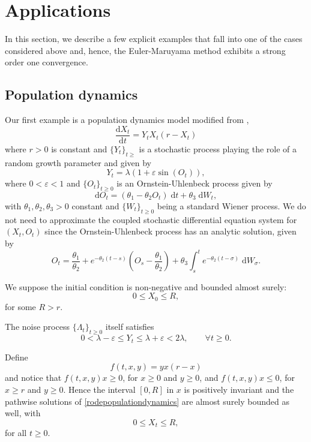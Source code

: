 \documentclass[reqno,12pt]{amsart}
\theoremstyle{plain}%
\theoremstyle{definition}
\begin{document}
\section{Applications}

In this section, we describe a few explicit examples that fall into one of the cases considered above and, hence, the Euler-Maruyama method exhibits a strong order one convergence.

\subsection{Population dynamics}

Our first example is a population dynamics model modified from \cite[Section 15.2]{HanKloeden2017},
\begin{equation}
    \label{rodepopulationdynamics}
    \frac{\mathrm{d}X_t}{\mathrm{d}t} = Y_t X_t (r - X_t)
\end{equation}
where $r > 0$ is constant and $\{Y_t\}_{t \geq}$ is a stochastic process playing the role of a random growth parameter and given by
\[
    Y_t = \lambda (1 + \varepsilon \sin(O_t)),
\]
where $0 < \varepsilon < 1$ and $\{O_t\}_{t \geq 0}$ is an Ornstein-Uhlenbeck process given by
\[
    \mathrm{d}O_t = (\theta_1 - \theta_2 O_t)\;\mathrm{d}t + \theta_3\;\mathrm{d}W_t,
\]
with $\theta_1, \theta_2, \theta_3 > 0$ constant and $\{W_t\}_{t\geq 0}$ being a standard Wiener process. We do not need to approximate the coupled stochastic differential equation system for $(X_t, O_t)$ since the Ornstein-Uhlenbeck process has an analytic solution, given by
\[
    O_t = \frac{\theta_1}{\theta_2} + e^{-\theta_2 (t - s)}\left(O_s - \frac{\theta_1}{\theta_2}\right) + \theta_3\int_s^t e^{-\theta_2 (t - \sigma)}\;\mathrm{d}W_\sigma.
\]

We suppose the initial condition is non-negative and bounded almost surely:
\[
    0 \leq X_0 \leq R,
\]
for some $R > r$.

The noise process $\{\Lambda_t\}_{t \geq 0}$ itself satisfies
\[
    0 < \lambda - \varepsilon \leq Y_t \leq \lambda + \varepsilon < 2\lambda, \qquad \forall t \geq 0.
\]

Define 
\[
    f(t, x, y) = yx(r - x)
\]
and notice that $f(t, x, y)x \geq 0$, for $x \geq 0$ and $y \geq 0$, and $f(t, x, y)x \leq 0$, for $x \geq r$ and $y \geq 0$. Hence the interval $[0, R]$ in $x$ is positively invariant and the pathwise solutions of \eqref{rodepopulationdynamics} are almost surely bounded as well, with
\[
    0 \leq X_t \leq R,
\]
for all $t \geq 0$.
\end{document}
